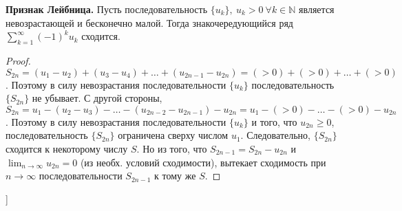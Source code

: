 \bigbreak
\textbf{Признак Лейбница.}
Пусть последовательность $\{u_k\},~u_k>0~\forall k\in \mathbb{N}$ является невозрастающей и бесконечно малой.
Тогда знакочередующийся ряд $\displaystyle \sum_{k=1}^{\infty} (-1)^k u_k$ сходится.

\begin{proof}
$S_{2n} = (u_1 - u_2) + (u_3 - u_4) + \dots + (u_{2n-1} - u_{2n}) = (>0) + (>0) + \dots + (>0)$. Поэтому в силу
невозрастания последовательности $\{u_k\}$ последовательность $\{S_{2n}\}$ не убывает.
С другой стороны, ${S_{2n}} = u_1 - (u_2 - u_3) - \dots - (u_{2n-2} - u_{2n-1}) - u_{2n} = u_1 - (>0) - \dots - (>0) - u_{2n}$. Поэтому в силу
невозрастания последовательности $\{u_k\}$ и того, что $u_{2n} \geqslant 0$, последовательность
$\{S_{2n}\}$ ограничена сверху числом $u_1$. Следовательно, $\{S_{2n}\}$ сходится к некоторому
числу $S$. Но из того, что $S_{2n-1} = S_{2n} - u_{2n}$ и $\displaystyle \lim_{n\to \infty} u_{2n} = 0$ (из необх. условий сходимости), вытекает сходимость при $n\rightarrow\infty$
последовательности ${S_{2n-1}}$ к тому же $S$.
\end{proof}



\bigbreak
[\cite[page 7-22]{ilin_matan}]

